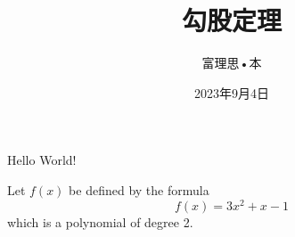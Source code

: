 \documentclass[12pt ,a4paper, oneside]{ctexart}
\title{\heiti 勾股定理}	%
\author{富理思•本}
\date{2023年9月4日}
\begin{document}
\maketitle

Hello World!

Let $f(x)$ be defined by the formula $$f(x) = 3x^2 + x - 1$$ which is a polynomial of degree 2.
\end{document}
